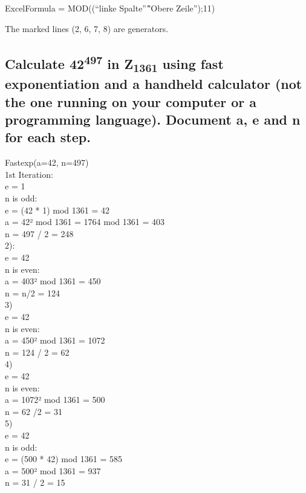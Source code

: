 ExcelFormula = MOD((“linke Spalte”\^”Obere Zeile”);11)

The marked lines (2, 6, 7, 8) are generators.

\subsection{Calculate 42\textsuperscript{497} in Z\textsubscript{1361} using fast exponentiation and a handheld calculator (not the one running on your computer or a programming language). Document a, e and n for each step.
}

Fastexp(a=42, n=497)\\
1st Iteration:\\

e = 1\\
n is odd:\\
e = (42 * 1) mod 1361 = 42\\
a = 42² mod 1361 = 1764 mod 1361 = 403\\
n = 497 / 2 = 248\\

2):\\     

e = 42\\
n is even:\\
a = 403² mod 1361 = 450\\
n = n/2 = 124\\

3)\\

e = 42\\
n is even:\\
a = 450² mod 1361 = 1072\\
n = 124 / 2 = 62\\

4)\\

e = 42\\
n is even:\\
a = 1072² mod 1361 = 500\\ 
n = 62 /2 = 31\\

5)\\

e = 42\\
n is odd:\\
e = (500 * 42) mod 1361 = 585\\
a = 500² mod 1361 = 937\\
n = 31 / 2 = 15\\

